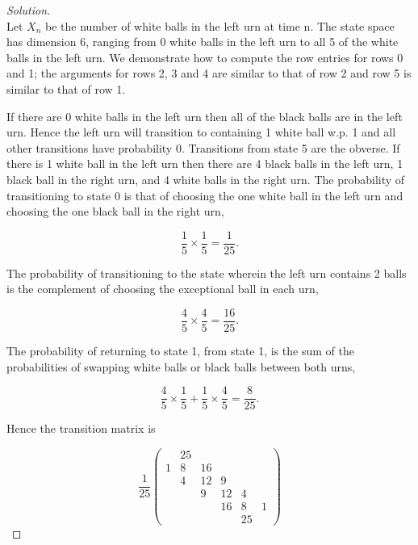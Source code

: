 \documentclass[12pt]{article}
\newenvironment{solution}
  {\begin{proof}[Solution]\renewcommand{\qedsymbol}{}}
  {\end{proof}}
\begin{document}
\begin{solution}\ \\

Let $X_n$ be the number of white balls in the left urn at time n. The state space has dimension 6, ranging from 0 white balls in the left urn to all 5 of the white balls in the left urn. We demonstrate how to compute the row entries for rows 0 and 1; the arguments for rows 2, 3 and 4 are similar to that of row 2 and row 5 is similar to that of row 1.

If there are 0 white balls in the left urn then all of the black balls are in the left urn. Hence the left urn will transition to containing 1 white ball w.p. 1 and all other transitions have probability 0. Transitions from state  5 are the obverse. If there is 1 white ball in the left urn then there are 4 black balls in the left urn, 1 black ball in the right urn, and 4 white balls in the right urn. The probability of transitioning to state 0 is that of choosing the one white ball in the left urn and choosing the one black ball in the right urn, 

$$ \frac{1}{5} \times \frac{1}{5} = \frac{1}{25}.$$

\noindent The probability of transitioning to the state wherein the left urn contains 2 balls is the complement of choosing the exceptional ball in each urn,

$$ \frac{4}{5} \times \frac{4}{5} = \frac{16}{25}.$$

\noindent The probability of returning to state 1, from state 1, is the sum of the probabilities of swapping white balls or black balls between both urns,

$$ \frac{4}{5} \times \frac{1}{5} + \frac{1}{5} \times \frac{4}{5}= \frac{8}{25}.$$

Hence the transition matrix is 

$$\frac{1}{25}\begin{pmatrix} 
	  & 25 &    &    &    &  \\ 
	1 & 8  & 16 &    &    &  \\
	  & 4  & 12 & 9  &    &  \\ 
	  &    & 9  & 12 & 4  &  \\
	  &    &    & 16 & 8  & 1\\
	  &    &    &    & 25 & 
\end{pmatrix}$$

\end{solution}
\end{document}
